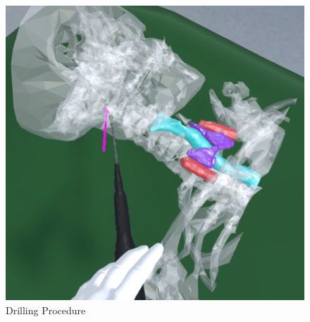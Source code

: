 \begin{figure}[ht!]
    \centering
    \includegraphics[width=\linewidth]{images/implementation/features/procedures/drilling.png}
    \caption{\label{fig::FeatureDrilling} Drilling Procedure}
\end{figure}
